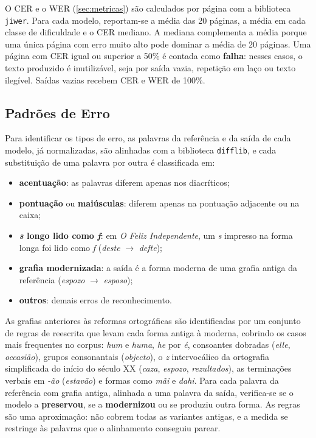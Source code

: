 \documentclass[noabntexcite,oneside]{ufsc-thesis-rn46-2019}
\begin{document}
O CER e o WER (\autoref{sec:metricas}) são calculados por página com a biblioteca \texttt{jiwer}. Para
cada modelo, reportam-se a média das 20 páginas, a média em cada classe de dificuldade e o
CER mediano. A mediana complementa a média porque uma única página com erro muito alto pode
dominar a média de 20 páginas. Uma página com CER igual ou superior a 50\% é contada como
\textbf{falha}: nesses casos, o texto produzido é inutilizável, seja por saída vazia,
repetição em laço ou texto ilegível. Saídas vazias recebem CER e WER de 100\%.

\subsection{Padrões de Erro}

Para identificar os tipos de erro, as palavras da referência e da saída de cada modelo,
já normalizadas, são alinhadas com a biblioteca \texttt{difflib}, e cada substituição de
uma palavra por outra é classificada em:

\begin{itemize}
    \item \textbf{acentuação}: as palavras diferem apenas nos diacríticos;
    \item \textbf{pontuação} ou \textbf{maiúsculas}: diferem apenas na pontuação
    adjacente ou na caixa;
    \item \textbf{\textit{s} longo lido como \textit{f}}: em \textit{O Feliz
    Independente}, um \textit{s} impresso na forma longa foi lido como \textit{f}
    (\textit{deste} $\to$ \textit{defte});
    \item \textbf{grafia modernizada}: a saída é a forma moderna de uma grafia antiga da
    referência (\textit{espozo} $\to$ \textit{esposo});
    \item \textbf{outros}: demais erros de reconhecimento.
\end{itemize}

As grafias anteriores às reformas ortográficas são identificadas por um conjunto de regras
de reescrita que levam cada forma antiga à moderna, cobrindo os casos mais frequentes no
corpus: \textit{hum} e \textit{huma}, \textit{he} por \textit{é}, consoantes dobradas
(\textit{elle}, \textit{occasião}), grupos consonantais (\textit{objecto}), o \textit{z}
intervocálico da ortografia simplificada do início do século XX (\textit{caza},
\textit{espozo}, \textit{rezultados}), as terminações verbais em \textit{-ão}
(\textit{estavão}) e formas como \textit{mãi} e \textit{dahi}. Para cada palavra da
referência com grafia antiga, alinhada a uma palavra da saída, verifica-se se o modelo a
\textbf{preservou}, se a \textbf{modernizou} ou se produziu outra forma. As regras são uma
aproximação: não cobrem todas as variantes antigas, e a medida se restringe às palavras que
o alinhamento conseguiu parear.
\end{document}
